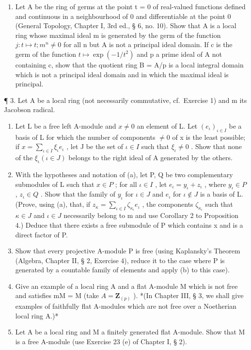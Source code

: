 \begin{enumerate}
\def\labelenumi{(\alph{enumi})}
\setcounter{enumi}{1}
\tightlist
\item
  Let A be the ring of germs at the point t = 0 of real-valued functions defined and continuous in a neighbourhood of 0 and differentiable at the point 0 (General Topology, Chapter I, 3rd ed., § 6, no. 10). Show that A is a local ring whose maximal ideal m is generated by the germ of the function \(j: t \mapsto t; m^{n} \neq 0\) for all n but A is not a principal ideal domain. If c is the germ of the function \(t \mapsto \exp(-1/t^{2})\) and p a prime ideal of A not containing c, show that the quotient ring B = A/p is a local integral domain which is not a principal ideal domain and in which the maximal ideal is principal.
\end{enumerate}

¶ 3. Let A be a local ring (not necessarily commutative, cf.~Exercise 1) and m its Jacobson radical.

\begin{enumerate}
\def\labelenumi{(\alph{enumi})}
\item
  Let L be a free left A-module and \(x \neq 0\) an element of L. Let \((e_{\iota})_{\iota \in I}\) be a basis of L for which the number of components \(\neq 0\) of x is the least possible; if \(x = \sum_{\iota \in I} \xi_{\iota} e_{\iota}\) , let J be the set of \(\iota \in I\) such that \(\xi_{\iota} \neq 0\) . Show that none of the \(\xi_{\iota} (\iota \in J)\) belongs to the right ideal of A generated by the others.
\item
  With the hypotheses and notation of (a), let P, Q be two complementary submodules of L such that \(x \in P\) ; for all \(\iota \in I\) , let \(e_{\iota} = y_{\iota} + z_{\iota}\) , where \(y_{\iota} \in P\) , \(z_{\iota} \in Q\) . Show that the family of \(y_{\iota}\) for \(\iota \in J\) and \(e_{\iota}\) for \(\iota \notin J\) is a basis of L. (Prove, using (a), that, if \(z_{\kappa} = \sum_{\iota \in I} \zeta_{\kappa_{\iota}} e_{\iota}\) , the components \(\zeta_{\kappa_{\iota}}\) such that \(\kappa \in J\) and \(\iota \in J\) necessarily belong to m and use Corollary 2 to Proposition 4.) Deduce that there exists a free submodule of P which contains x and is a direct factor of P.
\item
  Show that every projective A-module P is free (using Kaplansky's Theorem (Algebra, Chapter II, § 2, Exercise 4), reduce it to the case where P is generated by a countable family of elements and apply (b) to this case).
\item
  Give an example of a local ring A and a flat A-module M which is not free and satisfies mM = M (take \(A = \mathbf{Z}_{(p)}\) ). *(In Chapter III, § 3, we shall give examples of faithfully flat A-modules which are not free over a Noetherian local ring A.)*
\item
  Let A be a local ring and M a finitely generated flat A-module. Show that M is a free A-module (use Exercise 23 (e) of Chapter I, § 2).
\end{enumerate}

